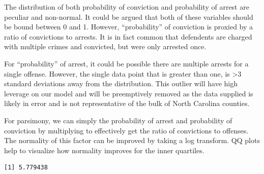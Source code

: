 \documentclass[]{article}
\newenvironment{Shaded}{}{}
\newcommand{\CommentTok}[1]{\textcolor[rgb]{0.00,0.50,0.00}{#1}}
\newcommand{\DataTypeTok}[1]{#1}
\newcommand{\DecValTok}[1]{#1}
\newcommand{\KeywordTok}[1]{\textcolor[rgb]{0.00,0.00,1.00}{#1}}
\newcommand{\NormalTok}[1]{#1}
\newcommand{\OperatorTok}[1]{#1}
\newcommand{\StringTok}[1]{\textcolor[rgb]{0.00,0.50,0.50}{#1}}
\begin{document}
The distribution of both probability of conviction and probability of
arrest are peculiar and non-normal. It could be argued that both of
these variables should be bound between 0 and 1. However,
``probability'' of conviction is proxied by a ratio of convictions to
arrests. It is in fact common that defendents are charged with multiple
crimes and convicted, but were only arrested once.

For ``probability'' of arrest, it could be possible there are multiple
arrests for a single offense. However, the single data point that is
greater than one, is \textgreater{}3 standard deviations away from the
distribution. This outlier will have high leverage on our model and will
be preemptively removed as the data supplied is likely in error and is
not representative of the bulk of North Carolina counties.

For parsimony, we can simply the probability of arrest and probability
of conviction by multiplying to effectively get the ratio of convictions
to offenses. The normality of this factor can be improved by taking a
log transform. QQ plots help to visualize how normality improves for the
inner quartiles.

\begin{Shaded}
\end{Shaded}

\begin{verbatim}
[1] 5.779438
\end{verbatim}

\begin{Shaded}
\end{Shaded}
\end{document}
